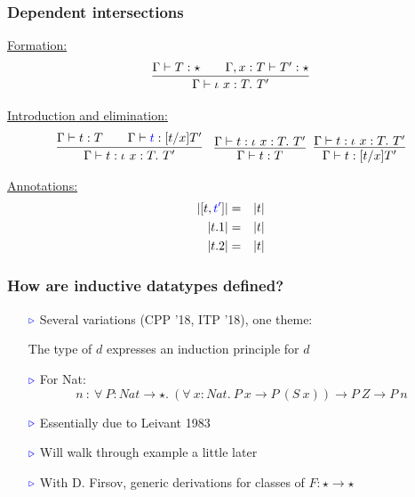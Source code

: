 \documentclass[11pt]{beamer}
\newcommand{\myb}[0]{\ensuremath{\textcolor{blue}{\triangleright}}}
\begin{document}
  
    

\begin{frame}
  \frametitle{Dependent intersections}

  \underline{Formation:}
  \[
  \infer{\Gamma\vdash \iota\ x:T.\ T'}{\Gamma\vdash T:\star \qquad \Gamma,x:T\vdash T':\star}
  \]

  \underline{Introduction and elimination:}
  \[
  \begin{array}{ll}
  \infer{\Gamma\vdash t : \iota\ x:T.\ T'}{\Gamma\vdash t : T \qquad \Gamma\vdash \textcolor{blue}{t} : [t/x]T'}
  &
  \infer{\Gamma\vdash t : T}{\Gamma\vdash t : \iota\ x:T.\ T'} \ \
  \infer{\Gamma\vdash t : [t/x]T'}{\Gamma\vdash t : \iota\ x:T.\ T'}
  \end{array}
  \]

  \underline{Annotations:}
  \begin{eqnarray*}
    |[t,\textcolor{blue}{t'}]| & = & |t| \\
    |t.1| & = & |t| \\
    |t.2| & = & |t|
  \end{eqnarray*}
\end{frame}

\begin{frame}
  \frametitle{How are inductive datatypes defined?}

  \begin{itemize}
  \item[$\myb$] Several variations (CPP '18, ITP '18), one theme:

    \vspace{.2cm}
    
{\color{blue}
    The type of $d$ expresses an induction principle for $d$ 
}

    \vspace{.2cm}


  \item[$\myb$] For Nat:
    \[
    n\ :\ \forall\ P : \textit{Nat} \to \star.\ (\forall\ x:\textit{Nat}.\ P\ x \to P\ (S\ x)) \to P\ Z \to P\ n
    \]
    
  \item[$\myb$] Essentially due to Leivant 1983
  \item[$\myb$] Will walk through example a little later
  \item[$\myb$] With D. Firsov, generic derivations for classes of $F : \star \to \star$
  \end{itemize}
\end{frame}
\end{document}
